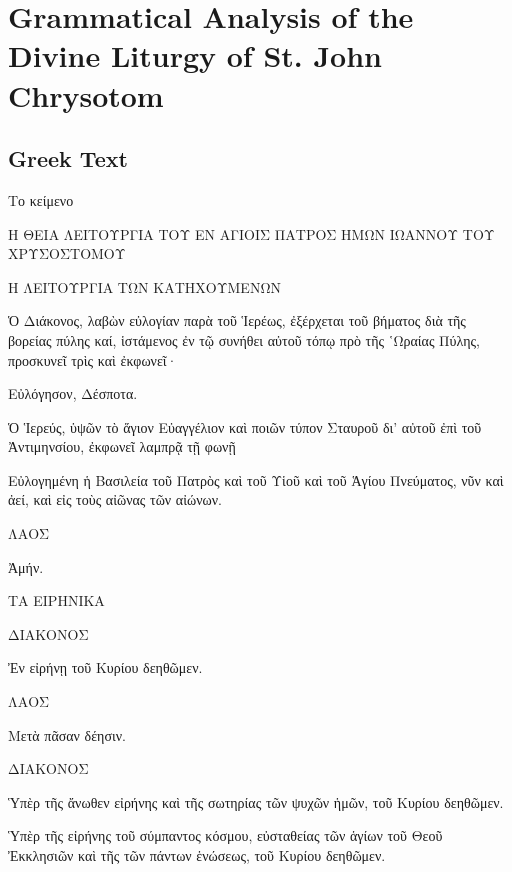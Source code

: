 \documentclass[extrafontsizes,17pt]{memoir}
\begin{document}
\chapter{Grammatical Analysis of the Divine Liturgy of St. John Chrysotom}

\section{Greek Text}

\pex Το κείμενο

\a

Η ΘΕΙΑ ΛΕΙΤΟΥΡΓΙΑ ΤΟΥ ΕΝ ΑΓΙΟΙΣ ΠΑΤΡΟΣ ΗΜΩΝ ΙΩΑΝΝΟΥ ΤΟΥ ΧΡΥΣΟΣΤΟΜΟΥ

\a

Η ΛΕΙΤΟΥΡΓΙΑ ΤΩΝ ΚΑΤΗΧΟΥΜΕΝΩΝ

\a

Ὁ Διάκονος, λαβὼν εὐλογίαν παρὰ τοῦ Ἱερέως, ἐξέρχεται τοῦ βήματος διὰ τῆς βορείας πύλης καί, ἱστάμενος ἐν τῷ συνήθει αὐτοῦ τόπῳ πρὸ τῆς ῾Ωραίας Πύλης, προσκυνεῖ τρὶς καὶ ἐκφωνεῖ·

\a

Εὐλόγησον, Δέσποτα.

\a 

Ὁ Ἱερεύς, ὑψῶν τὸ ἅγιον Εὐαγγέλιον καὶ ποιῶν τύπον Σταυροῦ δι’ αὐτοῦ ἐπὶ τοῦ Ἀντιμηνσίου, ἐκφωνεῖ λαμπρᾷ τῇ φωνῇ

\a

Εὐλογημένη ἡ Βασιλεία τοῦ Πατρὸς καὶ τοῦ Υἱοῦ καὶ τοῦ Ἁγίου Πνεύματος, νῦν καὶ ἀεί, καὶ εἰς τοὺς αἰῶνας τῶν αἰώνων.

\a

ΛΑΟΣ

\a 

Ἀμήν.

\a

ΤΑ ΕΙΡΗΝΙΚΑ

\a

ΔΙΑΚΟΝΟΣ

\a

Ἐν εἰρήνῃ τοῦ Κυρίου δεηθῶμεν.

\a

ΛΑΟΣ

\a

Μετὰ πᾶσαν δέησιν.

\a

ΔΙΑΚΟΝΟΣ

\a

Ὑπὲρ τῆς ἄνωθεν εἰρήνης καὶ τῆς σωτηρίας τῶν ψυχῶν ἡμῶν, τοῦ Κυρίου δεηθῶμεν.

\a

Ὑπὲρ τῆς εἰρήνης τοῦ σύμπαντος κόσμου, εὐσταθείας τῶν ἁγίων τοῦ Θεοῦ Ἐκκλησιῶν καὶ τῆς τῶν πάντων ἑνώσεως, τοῦ Κυρίου δεηθῶμεν.
\end{document}
